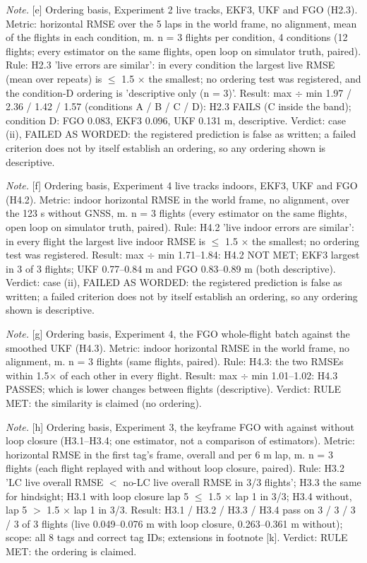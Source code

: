 \begin{table}[htbp]
\textit{Note.} [e] Ordering basis, Experiment 2 live tracks, EKF3, UKF and FGO (H2.3). Metric: horizontal RMSE over the 5 laps in the world frame, no alignment, mean of the flights in each condition, m. n = 3 flights per condition, 4 conditions (12 flights; every estimator on the same flights, open loop on simulator truth, paired). Rule: H2.3 'live errors are similar': in every condition the largest live RMSE (mean over repeats) is $\le$ 1.5 $\times$ the smallest; no ordering test was registered, and the condition-D ordering is 'descriptive only (n = 3)'. Result: max $\div$ min 1.97 / 2.36 / 1.42 / 1.57 (conditions A / B / C / D): H2.3 FAILS (C inside the band); condition D: FGO 0.083, EKF3 0.096, UKF 0.131 m, descriptive. Verdict: case (ii), FAILED AS WORDED: the registered prediction is false as written; a failed criterion does not by itself establish an ordering, so any ordering shown is descriptive.\par
\textit{Note.} [f] Ordering basis, Experiment 4 live tracks indoors, EKF3, UKF and FGO (H4.2). Metric: indoor horizontal RMSE in the world frame, no alignment, over the 123 s without GNSS, m. n = 3 flights (every estimator on the same flights, open loop on simulator truth, paired). Rule: H4.2 'live indoor errors are similar': in every flight the largest live indoor RMSE is $\le$ 1.5 $\times$ the smallest; no ordering test was registered. Result: max $\div$ min 1.71--1.84: H4.2 NOT MET; EKF3 largest in 3 of 3 flights; UKF 0.77--0.84 m and FGO 0.83--0.89 m (both descriptive). Verdict: case (ii), FAILED AS WORDED: the registered prediction is false as written; a failed criterion does not by itself establish an ordering, so any ordering shown is descriptive.\par
\textit{Note.} [g] Ordering basis, Experiment 4, the FGO whole-flight batch against the smoothed UKF (H4.3). Metric: indoor horizontal RMSE in the world frame, no alignment, m. n = 3 flights (same flights, paired). Rule: H4.3: the two RMSEs within 1.5$\times$ of each other in every flight. Result: max $\div$ min 1.01--1.02: H4.3 PASSES; which is lower changes between flights (descriptive). Verdict: RULE MET: the similarity is claimed (no ordering).\par
\textit{Note.} [h] Ordering basis, Experiment 3, the keyframe FGO with against without loop closure (H3.1--H3.4; one estimator, not a comparison of estimators). Metric: horizontal RMSE in the first tag's frame, overall and per 6 m lap, m. n = 3 flights (each flight replayed with and without loop closure, paired). Rule: H3.2 'LC live overall RMSE $<$ no-LC live overall RMSE in 3/3 flights'; H3.3 the same for hindsight; H3.1 with loop closure lap 5 $\le$ 1.5 $\times$ lap 1 in 3/3; H3.4 without, lap 5 $>$ 1.5 $\times$ lap 1 in 3/3. Result: H3.1 / H3.2 / H3.3 / H3.4 pass on 3 / 3 / 3 / 3 of 3 flights (live 0.049--0.076 m with loop closure, 0.263--0.361 m without); scope: all 8 tags and correct tag IDs; extensions in footnote [k]. Verdict: RULE MET: the ordering is claimed.\par

\end{table}
